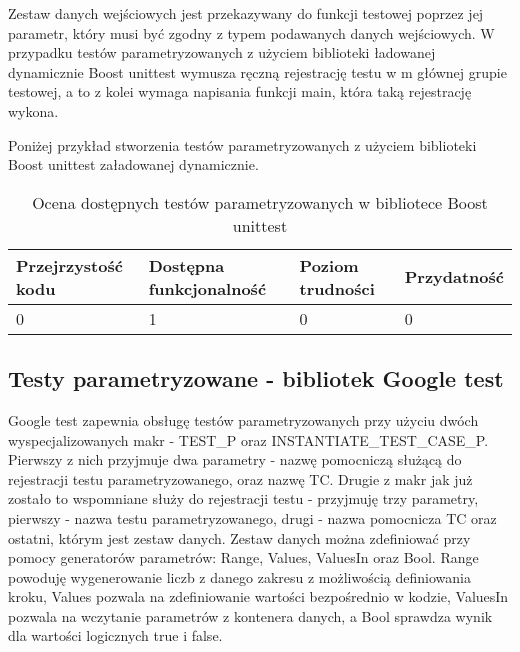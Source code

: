 \documentclass[12pt,a4paper,notitlepage]{report}
\begin{document}
Zestaw danych wejściowych jest przekazywany do funkcji testowej poprzez jej parametr, który musi być zgodny z typem podawanych danych wejściowych.
W przypadku testów parametryzowanych z użyciem biblioteki ładowanej dynamicznie Boost unittest wymusza ręczną rejestrację testu w m głównej grupie testowej, a to z kolei wymaga napisania funkcji main, która taką rejestrację wykona.

Poniżej przykład stworzenia testów parametryzowanych z użyciem biblioteki Boost unittest załadowanej dynamicznie.

			

\begin{center}
			\begin{table}[!ht]
			\caption{Ocena dostępnych testów parametryzowanych w bibliotece Boost unittest}
			\label{}
			\begin{tabular}[!hc]{|l|l|l|l|}
		\hline
		Przejrzystość kodu 	&	Dostępna funkcjonalność	&	Poziom trudności	&	Przydatność \\ \hline
		0					&	1						&	0					& 	0  			\\ \hline
			\end{tabular}
			\end{table} 
		\end{center}

\subsection{Testy parametryzowane - bibliotek Google test}

Google test zapewnia obsługę testów parametryzowanych przy użyciu dwóch wyspecjalizowanych makr - TEST{\_}P oraz INSTANTIATE{\_}TEST{\_}CASE{\_}P.
Pierwszy z nich przyjmuje dwa parametry - nazwę pomocniczą służącą do rejestracji testu parametryzowanego, oraz nazwę TC. Drugie z makr jak już zostało to wspomniane służy do rejestracji testu  - przyjmuję trzy parametry, pierwszy - nazwa testu parametryzowanego, drugi - nazwa pomocnicza TC oraz ostatni, którym jest zestaw danych.
Zestaw danych można zdefiniować przy pomocy generatorów parametrów: Range, Values, ValuesIn oraz Bool. Range powoduję wygenerowanie liczb z danego zakresu z możliwością definiowania kroku, Values pozwala na zdefiniowanie wartości bezpośrednio w kodzie, ValuesIn pozwala na wczytanie parametrów z kontenera danych, a Bool sprawdza wynik dla wartości logicznych true i false.
\end{document}
